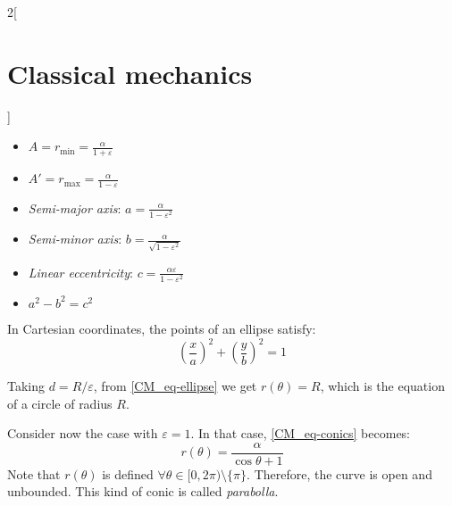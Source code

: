 \documentclass[../../../main_physics.tex]{subfiles}
\begin{document}
\begin{multicols}{2}[\section{Classical mechanics}]
\begin{definition}
    \begin{itemize}
      \item $\displaystyle A=r_\text{min}=\frac{\alpha}{1+\varepsilon}$
      \item $\displaystyle A'=r_\text{max}=\frac{\alpha}{1-\varepsilon}$
      \item \emph{Semi-major axis}: $\displaystyle a=\frac{\alpha}{1-\varepsilon^2}$
      \item \emph{Semi-minor axis}: $\displaystyle b=\frac{\alpha}{\sqrt{1-\varepsilon^2}}$
      \item \emph{Linear eccentricity}: $\displaystyle c=\frac{\alpha\varepsilon}{1-\varepsilon^2}$
      \item $a^2-b^2=c^2$
    \end{itemize}
    In Cartesian coordinates, the points of an ellipse satisfy: $${\left(\frac{x}{a}\right)}^2+{\left(\frac{y}{b}\right)}^2=1$$
    \begin{center}
      \begin{minipage}{\linewidth}
        \centering
        
        \label{CM_ellipse}
      \end{minipage}
    \end{center}
  \end{definition}
  \begin{proposition}
    Taking $d=R/\varepsilon$, from \cref{CM_eq-ellipse} we get $\displaystyle r(\theta)=R$, which is the equation of a circle of radius $R$.
  \end{proposition}
  \begin{definition}[Parabolla: $\varepsilon=1$]
    Consider now the case with $\varepsilon=1$. In that case, \cref{CM_eq-conics} becomes: $$r(\theta)=\frac{\alpha}{\cos\theta+ 1}$$ Note that $r(\theta)$ is defined $\forall\theta\in[0,2\pi)\setminus\{\pi\}$. Therefore, the curve is open and unbounded. This kind of conic is called \emph{parabolla}.


\end{definition}
\end{multicols}
\end{document}
